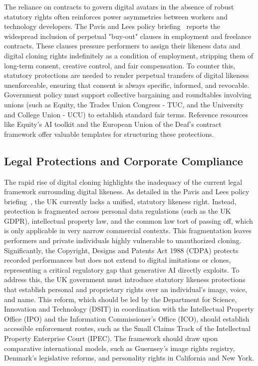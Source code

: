 \documentclass[pdflatex,sn-mathphys-num]{sn-jnl}
\theoremstyle{thmstyleone}
\theoremstyle{thmstyletwo}
\theoremstyle{thmstylethree}
\begin{document}
The reliance on contracts to govern digital avatars in the absence of robust statutory rights often reinforces power asymmetries between workers and technology developers. The Pavis and Lees policy briefing~\cite{pavis2025ai, signapselinkedin} reports the widespread inclusion of perpetual "buy-out" clauses in employment and freelance contracts. These clauses pressure performers to assign their likeness data and digital cloning rights indefinitely as a condition of employment, stripping them of long-term consent, creative control, and fair compensation. To counter this, statutory protections are needed to render perpetual transfers of digital likeness unenforceable, ensuring that consent is always specific, informed, and revocable. Government policy must support collective bargaining and roundtables involving unions (such as Equity, the Trades Union Congress - TUC, and the University and College Union - UCU) to establish standard fair terms. Reference resources like Equity's AI toolkit and the European Union of the Deaf's contract framework offer valuable templates for structuring these protections.

\subsection{Legal Protections and Corporate Compliance}\label{subsec:legal_compliance}
The rapid rise of digital cloning highlights the inadequacy of the current legal framework surrounding digital likeness. As detailed in the Pavis and Lees policy briefing~\cite{pavis2025ai, signapselinkedin}, the UK currently lacks a unified, statutory likeness right. Instead, protection is fragmented across personal data regulations (such as the UK GDPR), intellectual property law, and the common law tort of passing off, which is only applicable in very narrow commercial contexts. This fragmentation leaves performers and private individuals highly vulnerable to unauthorized cloning. Significantly, the Copyright, Designs and Patents Act 1988 (CDPA) protects recorded performances but does not extend to digital imitations or clones, representing a critical regulatory gap that generative AI directly exploits. To address this, the UK government must introduce statutory likeness protections that establish personal and proprietary rights over an individual's image, voice, and name. This reform, which should be led by the Department for Science, Innovation and Technology (DSIT) in coordination with the Intellectual Property Office (IPO) and the Information Commissioner's Office (ICO), should establish accessible enforcement routes, such as the Small Claims Track of the Intellectual Property Enterprise Court (IPEC). The framework should draw upon comparative international models, such as Guernsey's image rights registry, Denmark's legislative reforms, and personality rights in California and New York.
\end{document}
